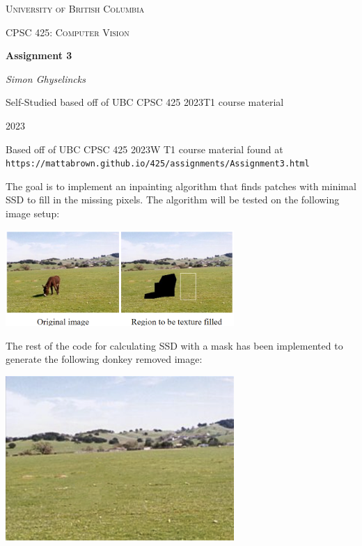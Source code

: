 \documentclass[12pt]{article}
\begin{document}
\begin{titlepage}
  \centering
  
  {\scshape\LARGE University of British Columbia \par}
  \vspace{1cm}
  {\scshape\Large CPSC 425: Computer Vision\par}
  \vspace{1.5cm}
  {\huge\bfseries Assignment 3\par}
  \vspace{2cm}
  {\Large\itshape Simon Ghyselincks\par}
  \vfill
  Self-Studied based off of UBC CPSC 425 2023T1 course material\par

  \vfill

  {\large 2023\par}
\end{titlepage}


Based off of UBC CPSC 425 2023W T1 course material found at \texttt{https://mattabrown.github.io/425/assignments/Assignment3.html}

The goal is to implement an inpainting algorithm that finds patches with minimal SSD to fill in the missing pixels. The algorithm will be tested on the following image setup:

\begin{center}
  \includegraphics[width=0.65\textwidth]{imgs/1-premise.png}
\end{center}

The rest of the code for calculating SSD with a mask has been implemented to generate the following donkey removed image:

\begin{center}
  \includegraphics[width=0.65\textwidth]{imgs/5-donkeyfilled.png}
\end{center}
\end{document}
